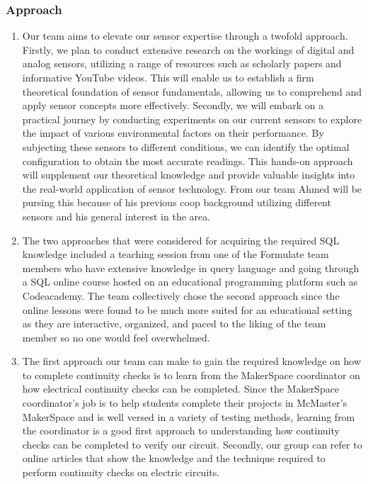 \documentclass[12pt, titlepage]{article}
\begin{document}
\subsubsection{Approach}
  \begin{enumerate}
    \item Our team aims to elevate our sensor expertise through a twofold approach. Firstly, we plan to conduct extensive research on the workings of digital and analog sensors, utilizing a range of resources such as scholarly papers and informative YouTube videos. This will enable us to establish a firm theoretical foundation of sensor fundamentals, allowing us to comprehend and apply sensor concepts more effectively. Secondly, we will embark on a practical journey by conducting experiments on our current sensors to explore the impact of various environmental factors on their performance. By subjecting these sensors to different conditions, we can identify the optimal configuration to obtain the most accurate readings. This hands-on approach will supplement our theoretical knowledge and provide valuable insights into the real-world application of sensor technology. From our team Ahmed will be pursing this because of his previous coop background utilizing different sensors and his general interest in the area.
    \item The two approaches that were considered for acquiring the required SQL knowledge included a teaching session from one of the Formulate team members who have extensive knowledge in query language and going through a SQL online course hosted on an educational programming platform such as Codeacademy. The team collectively chose the second approach since the online lessons were found to be much more suited for an educational setting as they are interactive, organized, and paced to the liking of the team member so no one would feel overwhelmed.
    \item The first approach our team can make to gain the required knowledge on how to complete continuity checks is to learn from the MakerSpace coordinator on how electrical continuity checks can be completed. Since the MakerSpace coordinator's job is to help students complete their projects in McMaster's MakerSpace and is well versed in a variety of testing methods, learning from the coordinator is a good first approach to understanding how continuity checks can be completed to verify our circuit. Secondly, our group can refer to online articles that show the knowledge and the technique required to perform continuity checks on electric circuits.
  \end{enumerate}


\end{document}
